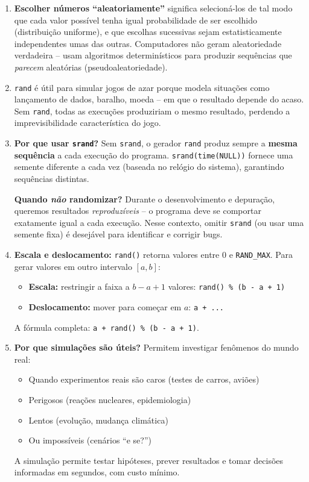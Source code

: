 \documentclass[12pt,a4paper]{article}
\begin{document}
\begin{respostabox}
\begin{enumerate}[label=\textbf{\alph*)}]

\item \textbf{Escolher números ``aleatoriamente''} significa selecioná-los de tal
modo que cada valor possível tenha igual probabilidade de ser escolhido (distribuição
uniforme), e que escolhas sucessivas sejam estatisticamente independentes umas das
outras. Computadores não geram aleatoriedade verdadeira -- usam algoritmos
determinísticos para produzir sequências que \textit{parecem} aleatórias
(pseudoaleatoriedade).

\item \texttt{rand} é útil para simular jogos de azar porque modela situações como
lançamento de dados, baralho, moeda -- em que o resultado depende do acaso. Sem
\texttt{rand}, todas as execuções produziriam o mesmo resultado, perdendo a
imprevisibilidade característica do jogo.

\item \textbf{Por que usar \texttt{srand}?} Sem \texttt{srand}, o gerador
\texttt{rand} produz sempre a \textbf{mesma sequência} a cada execução do programa.
\texttt{srand(time(NULL))} fornece uma semente diferente a cada vez (baseada no
relógio do sistema), garantindo sequências distintas.

\textbf{Quando \textit{não} randomizar?} Durante o desenvolvimento e depuração,
queremos resultados \textit{reproduzíveis} -- o programa deve se comportar
exatamente igual a cada execução. Nesse contexto, omitir \texttt{srand} (ou usar
uma semente fixa) é desejável para identificar e corrigir bugs.

\item \textbf{Escala e deslocamento:} \texttt{rand()} retorna valores entre 0 e
\texttt{RAND\_MAX}. Para gerar valores em outro intervalo $[a, b]$:
\begin{itemize}[noitemsep]
  \item \textbf{Escala:} restringir a faixa a $b - a + 1$ valores: \texttt{rand() \% (b - a + 1)}
  \item \textbf{Deslocamento:} mover para começar em $a$: \texttt{a + ...}
\end{itemize}
A fórmula completa: \texttt{a + rand() \% (b - a + 1)}.

\item \textbf{Por que simulações são úteis?} Permitem investigar fenômenos do mundo
real:
\begin{itemize}[noitemsep]
  \item Quando experimentos reais são caros (testes de carros, aviões)
  \item Perigosos (reações nucleares, epidemiologia)
  \item Lentos (evolução, mudança climática)
  \item Ou impossíveis (cenários ``e se?'')
\end{itemize}
A simulação permite testar hipóteses, prever resultados e tomar decisões
informadas em segundos, com custo mínimo.
\end{enumerate}
\end{respostabox}
\end{document}
